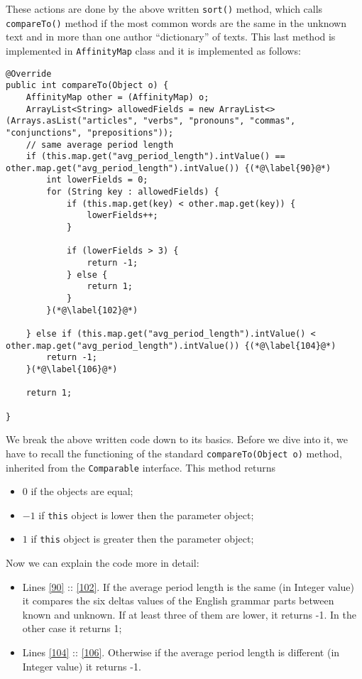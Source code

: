 \documentclass[a4paper,11pt, twoside]{article}
\begin{document}
		\noindent
		These actions are done by the above written \lstinline|sort()| method, which calls \lstinline|compareTo()| method if the most common words are the same in the unknown text and in more than one author ``dictionary'' of texts. This last method is implemented in \lstinline|AffinityMap| class and it is implemented as follows:
		\begin{lstlisting}[firstnumber=85,caption={AffinityMap compareTo method}, captionpos=b, label={lst:comparemethod}]
@Override
public int compareTo(Object o) {
	AffinityMap other = (AffinityMap) o;
	ArrayList<String> allowedFields = new ArrayList<>(Arrays.asList("articles", "verbs", "pronouns", "commas", "conjunctions", "prepositions"));
	// same average period length
	if (this.map.get("avg_period_length").intValue() == other.map.get("avg_period_length").intValue()) {(*@\label{90}@*)
		int lowerFields = 0;
		for (String key : allowedFields) {
			if (this.map.get(key) < other.map.get(key)) {
				lowerFields++;
			}

			if (lowerFields > 3) {
				return -1;
			} else {
				return 1;
			}
		}(*@\label{102}@*)
	
	} else if (this.map.get("avg_period_length").intValue() < other.map.get("avg_period_length").intValue()) {(*@\label{104}@*)
		return -1;
	}(*@\label{106}@*)

	return 1;

}
		\end{lstlisting}
		\noindent
		We break the above written code down to its basics. Before we dive into it, we have to recall the functioning of the standard \lstinline|compareTo(Object o)| method, inherited from the \lstinline|Comparable| interface. This method returns \begin{itemize}
			\item $0$ if the objects are equal;
			\item $-1$ if \lstinline|this| object is lower then the parameter object;
			\item $1$ if \lstinline|this| object is greater then the parameter object;
		\end{itemize}

	\noindent
	Now we can explain the code more in detail: 
		\begin{itemize}
			\item Lines \ref{90} :: \ref{102}. If the average period length is the same (in Integer value) it compares the six deltas values of the English grammar parts between known and unknown. If at least three of them are lower, it returns -1. In the other case it returns 1;
			\item Lines \ref{104} :: \ref{106}. Otherwise if the average period length is different (in Integer value) it returns -1.
		\end{itemize} 	
	
\end{document}
